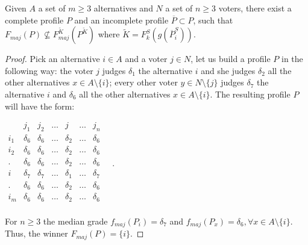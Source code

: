 \documentclass[version=3.21, pagesize, twoside=off, bibliography=totoc, DIV=calc, fontsize=12pt, a4paper]{scrartcl}
\begin{document}
\begin{proposition}
	\label{prop:notsamewinner}
	Given $A$ a set of $m\geq 3$ alternatives and $N$ a set of $n\geq3$ voters, there exist a complete profile $P$ and an incomplete profile $\overline{P} \subset P$, such that $F_{maj}(P) \nsubseteq F^{\tilde{K}}_{maj}(P^{\tilde{K}})$ \textemdash where $\tilde{K}=F^S_k(g(\overline{P}^S_i))$.
\end{proposition}
\begin{proof}
	Pick an alternative $i\in A$ and a voter $j \in N$, let us build a profile $P$ in the following way: the voter $j$ judges $\delta_1$ the alternative $i$ and she judges $\delta_2$ all the other alternatives $x \in A \setminus \{i\}$; every other voter $y\in N \setminus \{j\}$ judges $\delta_7$ the alternative $i$ and $\delta_6$ all the other alternatives $x \in A \setminus \{i\}$. The resulting profile $P$ will have the form:
	\begin{center}
		$
		\begin{array}{ccccccc}
			& j_1 & j_2 & \dots & j & \dots & j_n \\
			i_1 &	\delta_6 & \delta_6 & \dots & \delta_2 & \dots & \delta_6 \\
			i_2 &	\delta_6 & \delta_6 & \dots & \delta_2 & \dots & \delta_6 \\
			. &	\delta_6 & \delta_6 & \dots & \delta_2 & \dots & \delta_6 \\
			i &	\delta_7 & \delta_7 & \dots & \delta_1 & \dots & \delta_7 \\
			. &	\delta_6 & \delta_6 & \dots & \delta_2 & \dots & \delta_6 \\
			i_m &	\delta_6 & \delta_6 & \dots & \delta_2 & \dots & \delta_6 \\
		\end{array} \quad.
		$
	\end{center}
	For $n\geq 3$ the median grade $f_{maj}(P_i)=\delta_7$ and $f_{maj}(P_x)=\delta_6, \forall x \in A \setminus \{i\}$. Thus, the winner $F_{maj}(P)=\{i\}$.
	

\end{proof}
\end{document}
